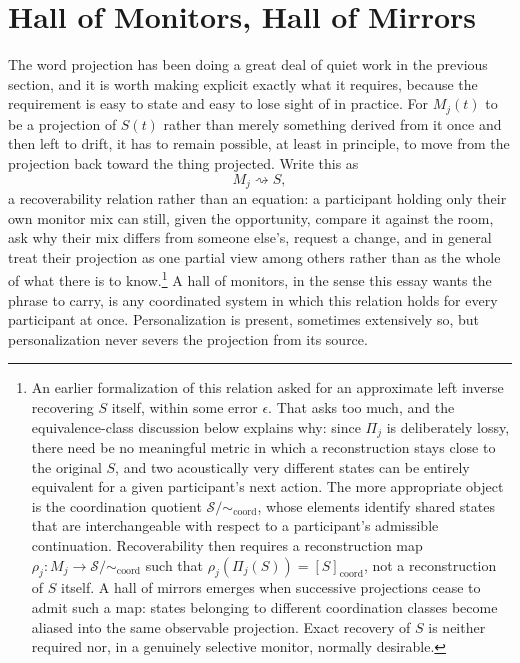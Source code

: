 \documentclass[12pt]{article}
\begin{document}
\section{Hall of Monitors, Hall of Mirrors}

The word projection has been doing a great deal of quiet work in the previous section, and it is worth making explicit exactly what it requires, because the requirement is easy to state and easy to lose sight of in practice. For $M_j(t)$ to be a projection of $S(t)$ rather than merely something derived from it once and then left to drift, it has to remain possible, at least in principle, to move from the projection back toward the thing projected. Write this as
\[
M_j \rightsquigarrow S,
\]
a recoverability relation rather than an equation: a participant holding only their own monitor mix can still, given the opportunity, compare it against the room, ask why their mix differs from someone else's, request a change, and in general treat their projection as one partial view among others rather than as the whole of what there is to know.\footnote{An earlier formalization of this relation asked for an approximate left inverse recovering $S$ itself, within some error $\epsilon$. That asks too much, and the equivalence-class discussion below explains why: since $\Pi_j$ is deliberately lossy, there need be no meaningful metric in which a reconstruction stays close to the original $S$, and two acoustically very different states can be entirely equivalent for a given participant's next action. The more appropriate object is the coordination quotient $\mathcal{S}/{\sim_{\mathrm{coord}}}$, whose elements identify shared states that are interchangeable with respect to a participant's admissible continuation. Recoverability then requires a reconstruction map $\rho_j : M_j \to \mathcal{S}/{\sim_{\mathrm{coord}}}$ such that $\rho_j(\Pi_j(S)) = [S]_{\mathrm{coord}}$, not a reconstruction of $S$ itself. A hall of mirrors emerges when successive projections cease to admit such a map: states belonging to different coordination classes become aliased into the same observable projection. Exact recovery of $S$ is neither required nor, in a genuinely selective monitor, normally desirable.} A hall of monitors, in the sense this essay wants the phrase to carry, is any coordinated system in which this relation holds for every participant at once. Personalization is present, sometimes extensively so, but personalization never severs the projection from its source.
\end{document}
